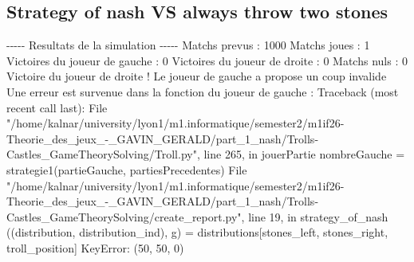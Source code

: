 \documentclass{article}%
\begin{document}
\subsection{Strategy of nash VS always throw two stones}%
\label{subsec:Strategy of nash VS always throw two stones}%
{-}{-}{-}{-}{-} Resultats de la simulation {-}{-}{-}{-}{-}\newline%
		\newline%
Matchs prevus : 1000\newline%
Matchs joues : 1\newline%
\newline%
Victoires du joueur de gauche : 0\newline%
Victoires du joueur de droite : 0\newline%
Matchs nuls : 0\newline%
\newline%
Victoire du joueur de droite ! Le joueur de gauche a propose un coup invalide\newline%
Une erreur est survenue dans la fonction du joueur de gauche : \newline%
Traceback (most recent call last):\newline%
  File "/home/kalnar/university/lyon1/m1.informatique/semester2/m1if26{-}Theorie\_des\_jeux\_{-}\_GAVIN\_GERALD/part\_1\_nash/Trolls{-}Castles\_GameTheorySolving/Troll.py", line 265, in jouerPartie\newline%
    nombreGauche = strategie1(partieGauche, partiesPrecedentes)\newline%
  File "/home/kalnar/university/lyon1/m1.informatique/semester2/m1if26{-}Theorie\_des\_jeux\_{-}\_GAVIN\_GERALD/part\_1\_nash/Trolls{-}Castles\_GameTheorySolving/create\_report.py", line 19, in strategy\_of\_nash\newline%
    ((distribution, distribution\_ind), g) = distributions{[}stones\_left, stones\_right, troll\_position{]}\newline%
KeyError: (50, 50, 0)\newline%

%
\end{document}
